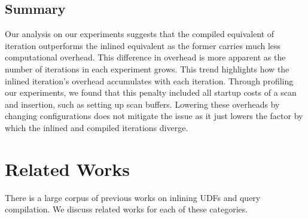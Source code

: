 \documentclass[12pt]{cmuthesis}
\begin{document}
          \newpage

    \section{Summary}
    Our analysis on our experiments suggests that the compiled equivalent of iteration outperforms the inlined equivalent as the former carries much less computational overhead. This difference in overhead is more apparent as the number of iterations in each experiment grows. This trend highlights how the inlined iteration's overhead accumulates with each iteration. Through profiling our experiments, we found that this penalty included all startup costs of a scan and insertion, such as setting up scan buffers. Lowering these overheads by changing configurations does not mitigate the issue as it just lowers the factor by which the inlined and compiled iterations diverge.\\

        \chapter{Related Works}
        \label{sec:relatedwork}


        There is a large corpus of previous works on inlining UDFs and query compilation. We discuss related works for each of these categories.
        
\end{document}
